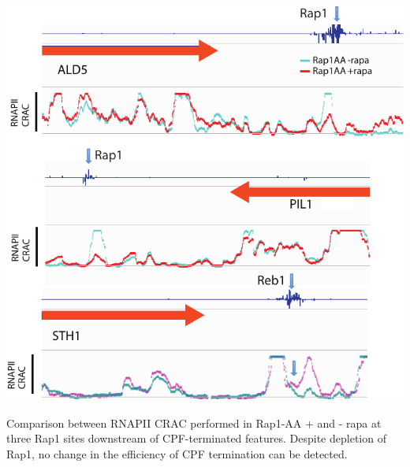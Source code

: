 \begin{suppfigure}[h!]

\centering
\includegraphics[width=\textwidth]{figures/results/rap/S8.pdf}
\caption[]{Comparison between RNAPII CRAC performed in Rap1-AA + and - rapa at three Rap1 sites downstream of CPF-terminated features. Despite depletion of Rap1, no change in the efficiency of CPF termination can be detected. }
\label{fig:S8}

\end{suppfigure}



